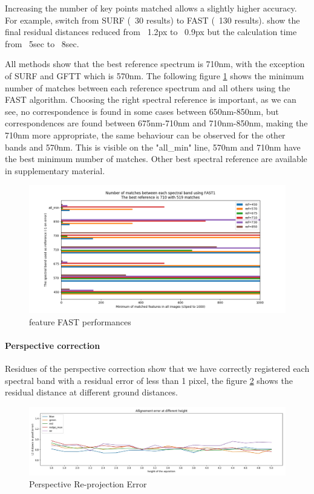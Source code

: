 \documentclass[]{elsarticle}
\begin{document}
	Increasing the number of key points matched allows a slightly higher accuracy. For example, switch from SURF (~30 results) to FAST (~130 results). show the final residual distances reduced from ~1.2px to ~0.9px but the calculation time from ~5sec to ~8sec.

	All methods show that the best reference spectrum is 710nm, with the exception of SURF and GFTT which is 570nm.
	The following figure \ref{fig:features-FAST-performances} shows the minimum number of matches between each reference spectrum and all others using the FAST algorithm.
	Choosing the right spectral reference is important, as we can see, no correspondence is found in some cases between 650nm-850nm,
	but correspondences are found between 675nm-710nm and 710nm-850nm, making the 710nm more appropriate,
	the same behaviour can be observed for the other bands and 570nm.
	This is visible on the "all\_min" line, 570nm and 710nm have the best minimum number of matches.
	Other best spectral reference are available in supplementary material.
	
	\begin{figure}[!htb]
		\centering
		\includegraphics[width=\linewidth]{../figures/comparaison-keypoint-matching-reference-FAST1.png}
		\caption{feature FAST performances}
		\label{fig:features-FAST-performances}
	\end{figure}
	
	\paragraph{Perspective correction}
	Residues of the perspective correction show that we have correctly registered each spectral band with a residual error of less than 1 pixel,
	the figure \ref{fig:perspective-error} shows the residual distance at different ground distances.
	
	\begin{figure}[!htb]
		\centering
		\includegraphics[width=\linewidth]{../figures/prespective-allignement-rmse.jpg}
		\caption{Perspective Re-projection Error}
		\label{fig:perspective-error}
	\end{figure}
	
\end{document}
